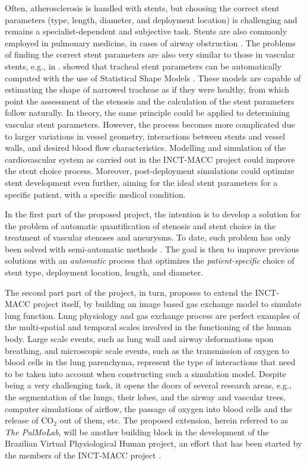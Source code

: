 Often, atherosclerosis is handled with stents, but choosing the correct stent parameters (type, length, diameter, and deployment location) is challenging and remains a specialist-dependent and subjective task. Stents are also commonly employed in pulmonary medicine, in cases of airway obstruction \citep{Chin,Freitag1,Freitag2,Freitag3,LeeP,Saito,Venuta}. The problems of finding the correct stent parameters are also very similar to those in vascular stents, e.g., in \citep{Bemmel}. \citet{Pinho:Trachea4} showed that tracheal stent parameters can be automatically computed with the use of Statistical Shape Models \citep{Cootes}. These models are capable of estimating the shape of narrowed tracheae as if they were healthy, from which point the assessment of the stenosis and the calculation of the stent parameters follow naturally. In theory, the same principle could be applied to determining vascular stent parameters. However, the process becomes more complicated due to larger variations in vessel geometry, interactions between stents and 
vessel walls, and desired blood flow characteristics. Modelling and simulation of the cardiovascular system as carried out in the INCT-MACC project could improve the stent choice process. Moreover, post-deployment simulations could optimize stent development even further, aiming for the ideal stent parameters for a specific patient, with a specific medical condition. 

In the first part of the proposed project, the intention is to develop a solution for the problem of automatic quantification of stenosis and stent choice in the treatment of vascular stenoses and aneurysms. To date, such problem has only been solved with semi-automatic methods \citep{Gremse01092011,Scherl200721,HERN-06b,Bemmel}. The goal is then to improve previous solutions with an {\em automatic} process that optimizes the {\em patient-specific} choice of stent type, deployment location, length, and diameter. 

The second part part of the project, in turn, proposes to extend the INCT-MACC project itself, by building an image based gas exchange model to simulate lung function. Lung physiology and gas exchange process are perfect examples of the multi-spatial and temporal scales involved in the functioning of the human body. Large scale events, such as lung wall and airway deformations upon breathing, and microscopic scale events, such as the transmission of oxygen to blood cells in the lung parenchyma, represent the type of interactions that need to be taken into account when constructing such a simulation model. Despite being a very challenging task, it opens the doors of several research areas, e.g., the segmentation of the lungs, their lobes, and the airway and vascular trees, computer simulations of airflow, the passage of oxygen into blood cells and the release of CO$_2$ out of them, etc. The proposed extension, herein referred to as {\em The PulMoLab}, will be another building block in the development of the Brazilian Virtual Physiological Human project, an effort that has been started by the members of the INCT-MACC project \citep{Blanco2010,Blanco2009a,Blanco2012,Urquiza2006,Larrabide2007}. 

